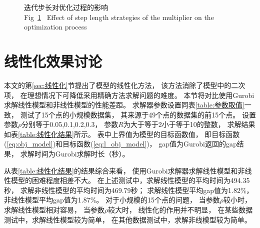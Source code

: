 \begin{figure}[htb]
	\caption{迭代步长对优化过程的影响\\Fig~\ref{fig:step_curves}~ Effect of step length strategies of the multiplier on the optimization process}
	\label{fig:step_curves}
	\vspace{-0.35cm} %
\end{figure}


\section{线性化效果讨论}
\label{sec:线性化优势}

本文的第\ref{sec:线性化}节提出了模型的线性化方法，
该方法消除了模型中的二次项，
在理想情况下可降低采用精确方法求解问题的难度。
本节将对比使用Gurobi求解线性模型和非线性模型的性能差距。
求解器参数设置同表\ref{table:参数取值}一致，
测试了15个点的小规模数据集，
其来源于49个点的数据集的前15个点。
设置参数$\rho$分别等于0.05,0.1,0.2,0.3，
参数$R$为大于等于2小于等于10的整数，
求解结果如表\ref{table:线性化结果}所示。
表中上界值为模型的目标函数值，
即目标函数(\ref{eq:obj_model})和目标函数(\ref{eq:l_obj_model})，
gap值为Gurobi返回的gap结果，
求解时间为Gurobi求解时长（秒）。


从表\ref{table:线性化结果}的结果综合来看，
使用Gurobi求解器求解线性模型和非线性模型的困难程度相差不大。
在上述测试中，求解线性模型的平均时间为494.35秒，
求解非线性模型的平均时间为469.79秒；
求解线性模型平均gap值为1.82\%，
非线性模型平均gap值为1.87\%。
对于小规模的15个点的问题，
当参数$\rho$较小时，
求解线性模型相对容易，
当参数$\rho$较大时，
线性化的作用并不明显，
在某些数据测试中，求解线性模型较为简单，
在其他数据测试中，求解非线模型较为简单。

